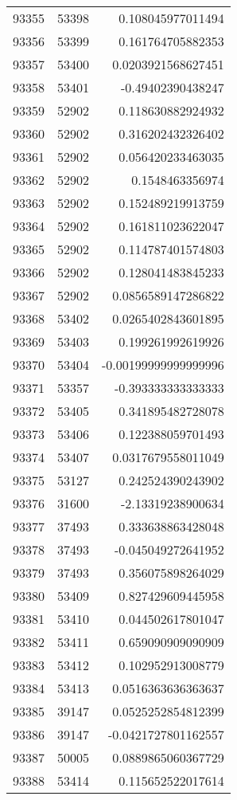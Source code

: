 \begin{tabular}{r | r | r}
93355 & 53398 & 0.108045977011494 \\
93356 & 53399 & 0.161764705882353 \\
93357 & 53400 & 0.0203921568627451 \\
93358 & 53401 & -0.49402390438247 \\
93359 & 52902 & 0.118630882924932 \\
93360 & 52902 & 0.316202432326402 \\
93361 & 52902 & 0.056420233463035 \\
93362 & 52902 & 0.1548463356974 \\
93363 & 52902 & 0.152489219913759 \\
93364 & 52902 & 0.161811023622047 \\
93365 & 52902 & 0.114787401574803 \\
93366 & 52902 & 0.128041483845233 \\
93367 & 52902 & 0.0856589147286822 \\
93368 & 53402 & 0.0265402843601895 \\
93369 & 53403 & 0.199261992619926 \\
93370 & 53404 & -0.00199999999999996 \\
93371 & 53357 & -0.393333333333333 \\
93372 & 53405 & 0.341895482728078 \\
93373 & 53406 & 0.122388059701493 \\
93374 & 53407 & 0.0317679558011049 \\
93375 & 53127 & 0.242524390243902 \\
93376 & 31600 & -2.13319238900634 \\
93377 & 37493 & 0.333638863428048 \\
93378 & 37493 & -0.045049272641952 \\
93379 & 37493 & 0.356075898264029 \\
93380 & 53409 & 0.827429609445958 \\
93381 & 53410 & 0.044502617801047 \\
93382 & 53411 & 0.659090909090909 \\
93383 & 53412 & 0.102952913008779 \\
93384 & 53413 & 0.0516363636363637 \\
93385 & 39147 & 0.0525252854812399 \\
93386 & 39147 & -0.0421727801162557 \\
93387 & 50005 & 0.0889865060367729 \\
93388 & 53414 & 0.115652522017614 \\

\end{tabular}
